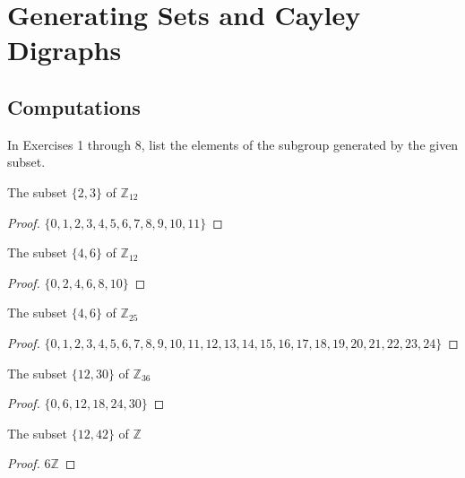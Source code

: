 \section{Generating Sets and Cayley Digraphs}

\subsection*{Computations}

In Exercises 1 through 8, list the elements of the subgroup generated by the given subset.

\begin{exercise}
    The subset $\{ 2, 3 \}$ of $\mathbb{Z}_{12}$
\end{exercise}

\begin{proof}
    $\{ 0, 1, 2, 3, 4, 5, 6, 7, 8, 9, 10, 11 \}$
\end{proof}

\begin{exercise}
    The subset $\{ 4, 6 \}$ of $\mathbb{Z}_{12}$
\end{exercise}

\begin{proof}
    $\{ 0, 2, 4, 6, 8, 10 \}$
\end{proof}

\begin{exercise}
    The subset $\{ 4, 6 \}$ of $\mathbb{Z}_{25}$
\end{exercise}

\begin{proof}
    $\{ 0, 1, 2, 3, 4, 5, 6, 7, 8, 9, 10, 11, 12, 13, 14, 15, 16, 17, 18, 19, 20, 21, 22, 23, 24 \}$
\end{proof}

\begin{exercise}
    The subset $\{ 12, 30 \}$ of $\mathbb{Z}_{36}$
\end{exercise}

\begin{proof}
    $\{ 0, 6, 12, 18, 24, 30 \}$
\end{proof}

\begin{exercise}
    The subset $\{ 12, 42 \}$ of $\mathbb{Z}$
\end{exercise}

\begin{proof}
    $6\mathbb{Z}$
\end{proof}

